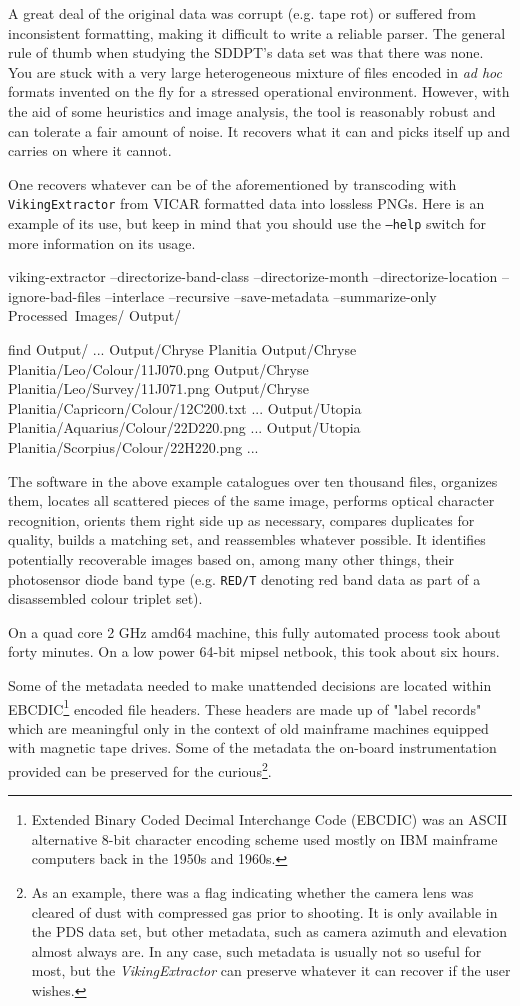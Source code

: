 A great deal of the original data was corrupt (e.g. tape rot) or suffered from inconsistent formatting, making it difficult to write a reliable parser. The general rule of thumb when studying the SDDPT's data set was that there was none. You are stuck with a very large heterogeneous mixture of files encoded in {\it ad hoc} formats invented on the fly for a stressed operational environment. However, with the aid of some heuristics and image analysis, the tool is reasonably robust and can tolerate a fair amount of noise. It recovers what it can and picks itself up and carries on where it cannot.

One recovers whatever can be of the aforementioned by transcoding with {\tt VikingExtractor} from VICAR formatted data into lossless PNGs. Here is an example of its use, but keep in mind that you should use the {\tt --help} switch for more information on its usage.

\startCodeExample
\type{$} viking-extractor --directorize-band-class --directorize-month --directorize-location --ignore-bad-files --interlace --recursive --save-metadata --summarize-only Processed\ Images/ Output/

\type{$} find Output/
...
Output/Chryse Planitia
Output/Chryse Planitia/Leo/Colour/11J070.png
Output/Chryse Planitia/Leo/Survey/11J071.png
Output/Chryse Planitia/Capricorn/Colour/12C200.txt
...
Output/Utopia Planitia/Aquarius/Colour/22D220.png
...
Output/Utopia Planitia/Scorpius/Colour/22H220.png
...
\stopCodeExample

The software in the above example catalogues over ten thousand files, organizes them, locates all scattered pieces of the same image, performs optical character recognition, orients them right side up as necessary, compares duplicates for quality, builds a matching set, and reassembles whatever possible. It identifies potentially recoverable images based on, among many other things, their photosensor diode band type (e.g. {\tt RED/T} denoting red band data as part of a disassembled colour triplet set). 

On a quad core 2 GHz amd64 machine, this fully automated process took about forty minutes. On a low power 64-bit mipsel netbook, this took about six hours.

Some of the metadata needed to make unattended decisions are located within EBCDIC\footnote{Extended Binary Coded Decimal Interchange Code (EBCDIC) was an ASCII alternative 8-bit character encoding scheme used mostly on IBM mainframe computers back in the 1950s and 1960s.} encoded file headers. These headers are made up of "label records" which are meaningful only in the context of old mainframe machines equipped with magnetic tape drives. Some of the metadata the on-board instrumentation provided can be preserved for the curious\footnote{As an example, there was a flag indicating whether the camera lens was cleared of dust with compressed gas prior to shooting. It is only available in the PDS data set, but other metadata, such as camera azimuth and elevation almost always are. In any case, such metadata is usually not so useful for most, but the {\it VikingExtractor} can preserve whatever it can recover if the user wishes.}.


